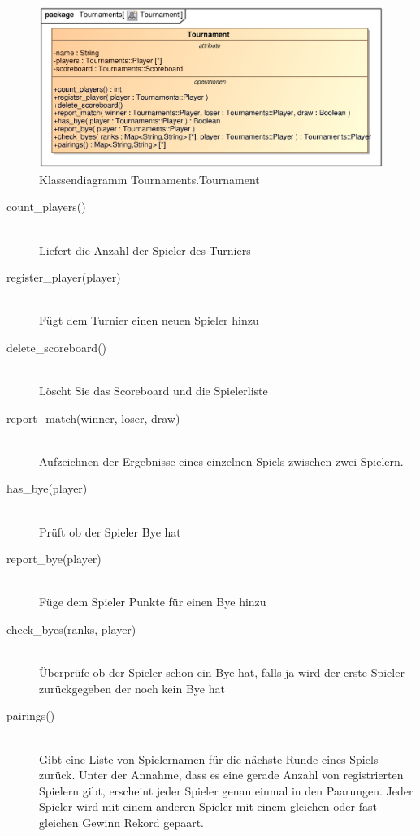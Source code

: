 \begin{figure}[H]
    \myfloatalign
    \includegraphics[width=\textwidth]{gfx/MtGDeepAnalysis/Tournament.eps}
    \caption{Klassendiagramm Tournaments.Tournament}
    \label{fig:class:Tournaments.Tournament}
\end{figure}

\begin{description}
    \item[count\_players()] \hfill \\
    Liefert die Anzahl der Spieler des Turniers
    
    \item[register\_player(player)] \hfill \\
    Fügt dem Turnier einen neuen Spieler hinzu
    
    \item[delete\_scoreboard()] \hfill \\
    Löscht Sie das Scoreboard und die Spielerliste
    
    \item[report\_match(winner, loser, draw)] \hfill \\
    Aufzeichnen der Ergebnisse eines einzelnen Spiels zwischen zwei Spielern.
    
    \item[has\_bye(player)] \hfill \\
    Prüft ob der Spieler Bye hat
    
    \item[report\_bye(player)] \hfill \\
    Füge dem Spieler Punkte für einen Bye hinzu
    
    \item[check\_byes(ranks, player)] \hfill \\
    Überprüfe ob der Spieler schon ein Bye hat, falls ja wird der erste Spieler zurückgegeben der noch kein Bye hat
    
    \item[pairings()] \hfill \\
    Gibt eine Liste von Spielernamen für die nächste Runde eines Spiels zurück. Unter der Annahme, dass es eine gerade Anzahl von registrierten Spielern gibt, erscheint jeder Spieler genau einmal in den Paarungen. Jeder Spieler wird mit einem anderen Spieler mit einem gleichen oder fast gleichen Gewinn Rekord gepaart.
\end{description}

